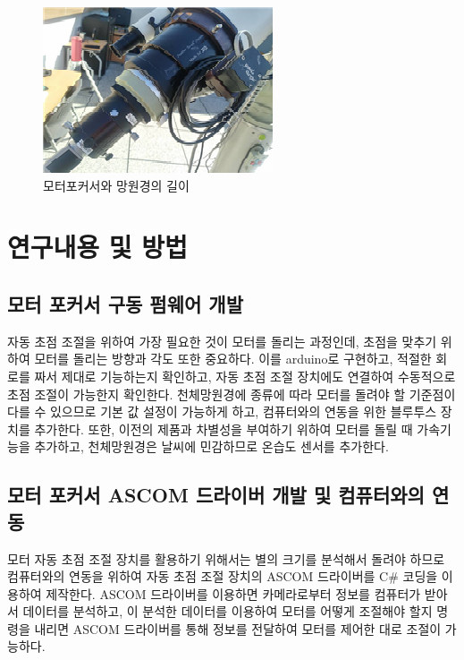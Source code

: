 \documentclass{abstract_hutech}
\begin{document}
\begin{figure}[h]
	\centering
	\includegraphics[width=1\linewidth]{telescope3}
	\caption{모터포커서와 망원경의 길이}
	\label{fig:telescope3}
\end{figure}

\section{연구내용 및 방법}

\subsection{모터 포커서 구동 펌웨어 개발}

자동 초점 조절을 위하여 가장 필요한 것이 모터를 돌리는 과정인데, 초점을 맞추기 위하여 모터를 돌리는 방향과 각도 또한 중요하다. 이를 arduino로 구현하고, 적절한 회로를 짜서 제대로 기능하는지 확인하고, 자동 초점 조절 장치에도 연결하여 수동적으로 초점 조절이 가능한지 확인한다. 천체망원경에 종류에 따라 모터를 돌려야 할 기준점이 다를 수 있으므로 기본 값 설정이 가능하게 하고, 컴퓨터와의 연동을 위한 블루투스 장치를 추가한다. 또한, 이전의 제품과 차별성을 부여하기 위하여 모터를 돌릴 때 가속기능을 추가하고, 천체망원경은 날씨에 민감하므로 온습도 센서를 추가한다.

\subsection{모터 포커서 ASCOM 드라이버 개발 및 컴퓨터와의 연동}

모터 자동 초점 조절 장치를 활용하기 위해서는 별의 크기를 분석해서 돌려야 하므로 컴퓨터와의 연동을 위하여 자동 초점 조절 장치의 ASCOM 드라이버를 C\# 코딩을 이용하여 제작한다. ASCOM 드라이버를 이용하면 카메라로부터 정보를 컴퓨터가 받아서 데이터를 분석하고, 이 분석한 데이터를 이용하여 모터를 어떻게 조절해야 할지 명령을 내리면 ASCOM 드라이버를 통해 정보를 전달하여 모터를 제어한 대로 조절이 가능하다.
\end{document}
